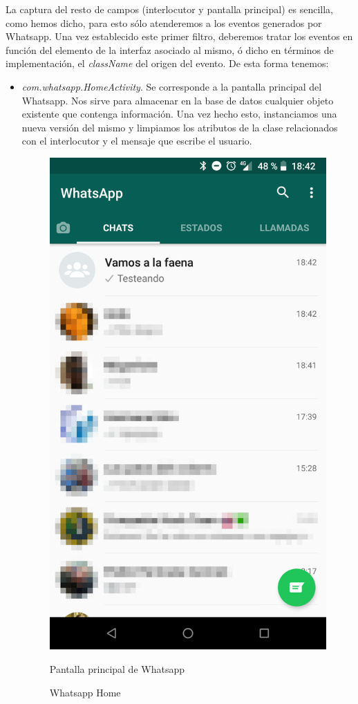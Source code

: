 \documentclass[12pt,a4paper,oneside]{book} %
\begin{document}
La captura del resto de campos (interlocutor y pantalla principal) es sencilla, como hemos dicho, para esto sólo atenderemos a los eventos generados por Whatsapp. Una vez establecido este primer filtro, deberemos tratar los eventos en función del elemento de la interfaz asociado al mismo, ó dicho en términos de implementación, el \textit{className} del origen del evento. De esta forma tenemos: 
\begin{itemize}
\item \textit{com.whatsapp.HomeActivity}. Se corresponde a la pantalla principal del Whatsapp. Nos sirve para almacenar en la base de datos cualquier objeto existente que contenga información. Una vez hecho esto, instanciamos una nueva versión del mismo y limpiamos los atributos de la clase relacionados con el interlocutor y el mensaje que escribe el usuario. 
\begin{figure}[H]
	\begin{center}
     	\includegraphics[scale=0.2]{pictures/IRL/whatsapp/whatsapp_home.png}
	    	\caption{Whatsapp Home}{Pantalla principal de Whatsapp}
    	\label{fig:Whatsapp Home}
	\end{center}
\end{figure}


\end{itemize}
\end{document}
